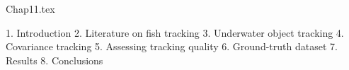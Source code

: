 Chap11.tex

1. Introduction
2. Literature on fish tracking
3. Underwater object tracking
4. Covariance tracking
5. Assessing tracking quality
6. Ground-truth dataset
7. Results
8. Conclusions
